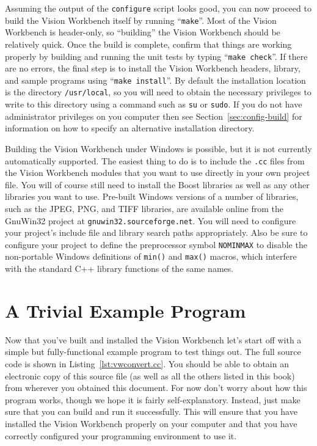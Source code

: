 Assuming the output of the \verb#configure# script looks good, you can
now proceed to build the Vision Workbench itself by running
``\verb#make#''.  Most of the Vision Workbench is header-only, so
``building'' the Vision Workbench should be relatively quick.  Once
the build is complete, confirm that things are working properly by
building and running the unit tests by typing ``\verb#make check#''.
If there are no errors, the final step is to install the Vision
Workbench headers, library, and sample programs using
``\verb#make install#''.  By default the installation location is the
directory \verb#/usr/local#, so you will need to obtain the necessary
privileges to write to this directory using a command such as
\verb#su# or \verb#sudo#.  If you do not have administrator privileges
on you computer then see Section~\ref{sec:config-build} for
information on how to specify an alternative installation directory.

Building the Vision Workbench under Windows is possible, but it is not
currently automatically supported.  The easiest thing to do is to
include the \verb#.cc# files from the Vision Workbench modules that
you want to use directly in your own project file.  You will of course
still need to install the Boost libraries as well as any other
libraries you want to use.  Pre-built Windows versions of a number of
libraries, such as the JPEG, PNG, and TIFF libraries, are available
online from the GnuWin32 project at \verb#gnuwin32.sourceforge.net#.
You will need to configure your project's include file and library
search paths appropriately.  Also be sure to configure your project to
define the preprocessor symbol \verb#NOMINMAX# to disable the
non-portable Windows definitions of \verb#min()# and \verb#max()#
macros, which interfere with the standard C++ library functions of the
same names.

\section{A Trivial Example Program}

Now that you've built and installed the Vision Workbench let's start
off with a simple but fully-functional example program to test things
out.  The full source code is shown in Listing~\ref{lst:vwconvert.cc}.
You should be able to obtain an electronic copy of this source file
(as well as all the others listed in this book) from wherever you
obtained this document.  For now don't worry about how this program
works, though we hope it is fairly self-explanatory.  Instead, just
make sure that you can build and run it successfully.  This will
ensure that you have installed the Vision Workbench properly on your
computer and that you have correctly configured your programming
environment to use it.

